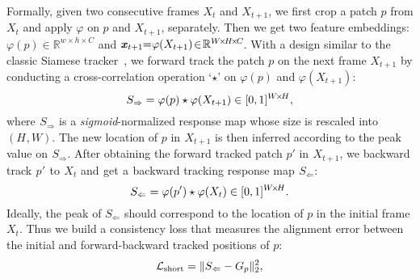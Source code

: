 \documentclass[10pt,twocolumn,letterpaper]{article}
\begin{document}
Formally, given two consecutive frames $X_{t}$ and $X_{t+1}$, we first crop a patch $p$ from $X_t$ and apply $\varphi$ on $p$ and $X_{t+1}$, separately. Then we get two feature embeddings: $\varphi(p)\!\in\!\mathbb{R}^{w\!\times\!h\!\times\!C\!}$  and $\textbf{\textit{x}}_{t+1\!}\!=_{\!}\!\varphi(X_{t+1})\!\in\!\mathbb{R}^{W\!\times\!H\!\times\!C\!}$. With a design similar to the classic Siamese tracker~\!\cite{bertinetto2016fully}, we forward track the patch $p$ on the next frame $X_{t+1}$ by conducting a cross-correlation operation `$\star$' on $\varphi(p)$ and $\varphi(X_{t+1})$:
\vspace{-2pt}
\begin{equation}\small
S_{\Rightarrow} = \varphi(p)\star\varphi(X_{t+1}) \in [0, 1]^{W\!\times\!H},
\label{equ:fortrack}
\vspace{-1pt}
\end{equation}
where$_{\!}$ $S_{\Rightarrow\!}$ is a \textit{sigmoid}-normalized response map whose size is rescaled into$_{\!}$ $(H_{\!}, W)$. The new location of $p$ in$_{\!}$ $X_{t+1\!}$ is then inferred according to the peak value on$_{\!}$ $S_{\Rightarrow}$. After obtaining the forward tracked patch $p'$ in$_{\!}$ $X_{t+1}$, we backward track$_{\!}$  $p'_{\!}$ to$_{\!}$ $X_{t\!}$ and$_{\!}$  get$_{\!}$  a$_{\!}$  backward tracking response map$_{\!}$ $S_{\Leftarrow}$:
\vspace{-8pt}
\begin{equation}\small
S_{\Leftarrow} = \varphi(p')\star\varphi(X_{t}) \in [0, 1]^{W\!\times\!H}.
\label{equ:backtrack-correlation}
\vspace{-0pt}
\end{equation}
Ideally, the peak of $S_{\Leftarrow\!}$ should correspond to the location of $p$ in the initial frame $X_t$. Thus we build a consistency loss that measures the alignment error
between the initial and forward-backward tracked positions of $p$:
\vspace{-2pt}
\begin{equation}\small
\mathcal{L}_{\text{short}} = \|S_{\Leftarrow}- G_p\|_2^2,
\label{equ:clip-level}
\vspace{-1pt}
\end{equation} 	
\end{document}
